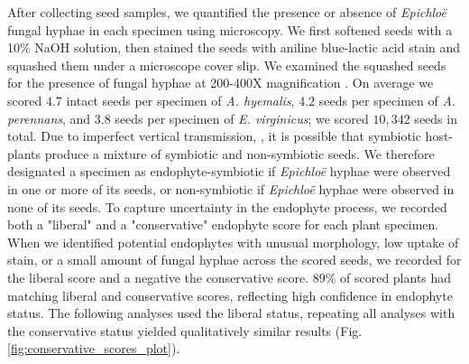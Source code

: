 \documentclass[11pt]{article}
\let\cite\citep
\newcommand{\firstrevise}[1]{{\color{black}{#1}}}
\newcommand{\secondrevise}[1]{{\color{black}{#1}}}
\begin{document}
After collecting seed samples, we quantified the presence or absence of \emph{Epichloë} fungal hyphae in each specimen using microscopy. 
We first softened seeds with a 10\% NaOH solution, then stained the seeds with aniline blue-lactic acid stain and squashed them under a microscope cover slip. 
We examined the squashed seeds for the presence of fungal hyphae at 200-400X magnification \cite{bacon2018stains}.
On average we scored $4.7$ intact seeds per specimen of \emph{A. hyemalis}, $4.2$ seeds per specimen of \emph{A. perennans}, and $3.8$ seeds per specimen of \emph{E. virginicus}; we scored $10,342$ seeds in total.
Due to imperfect vertical transmission, \firstrevise{the production of symbiont-free offspring from symbiotic hosts} \cite{afkhami2008symbiosis}, it is possible that symbiotic host-plants produce a mixture of symbiotic and non-symbiotic seeds. 
We therefore designated a specimen as endophyte-symbiotic if \emph{Epichloë} hyphae were observed in one or more of its seeds, or non-symbiotic if \emph{Epichloë} hyphae were observed in none of its seeds. 
To capture uncertainty in the endophyte \firstrevise{identification} process, we recorded both a "liberal" and a "conservative" endophyte score for each plant specimen.  
\firstrevise{When we confidently identified endophytes within a specimen's seeds, we assigned matching liberal and conservative scores.}
When we identified potential endophytes with unusual morphology, low uptake of stain, or a small amount of fungal hyphae across the scored seeds, we recorded \firstrevise{ a positive identification} for the liberal score and a negative \firstrevise{identification for} the conservative score.
\secondrevise{We recorded the identity of each scorer as part of the data collection process.}
$89$\% of scored plants had matching liberal and conservative scores, reflecting high confidence in endophyte status.
The following analyses used the liberal status, \firstrevise{however} repeating all analyses with the conservative status yielded qualitatively similar results (Fig. \ref{fig:conservative_scores_plot}).
\end{document}
